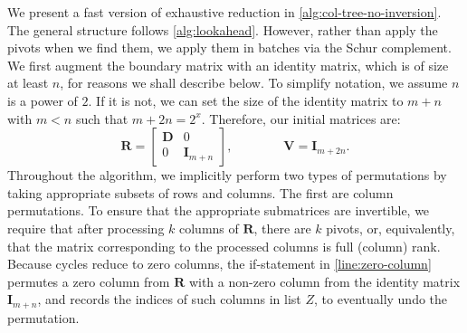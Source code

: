 \documentclass{article}
\newcommand{\mat}[1]{\mathbf{#1}}
\newcommand{\bdr}{\mat{D}}
\begin{document}
\begin{algorithm}[h]

\end{algorithm}



We present a fast version of exhaustive reduction in \cref{alg:col-tree-no-inversion}.
The general structure follows \cref{alg:lookahead}. However, rather than apply
the pivots when we find them, we apply them in batches via the Schur complement.
%
%
We first augment the boundary matrix with an identity matrix, which is of size at least $n$, for reasons we shall describe below. To simplify notation, we assume $n$ is a power of $2$. If it is not, we can set the size of the identity matrix to $m+n$ with $m<n$ such that $m+2n = 2^x$. Therefore, our initial matrices are:
\[\mat{R} = \begin{bmatrix} \bdr & 0  \\ 0 & \mat{I}_{m+n} \end{bmatrix}, \qquad\qquad \mat{V} = \mat{I}_{m+2n}.\]
Throughout the algorithm, we implicitly perform two types of permutations by
taking appropriate subsets of rows and columns.
The first are column permutations.  To ensure that the appropriate submatrices are invertible, we require
that after processing $k$ columns of $\mat{R}$, there are $k$ pivots, or, equivalently,
that the matrix corresponding to the processed columns is full (column) rank.
Because cycles reduce to zero columns, the if-statement in
\cref{line:zero-column} permutes a zero column from $\mat{R}$
with a non-zero column from the identity matrix $\mat{I}_{m+n}$, and records the
indices of such columns in list $Z$, to eventually undo the permutation.
\end{document}
